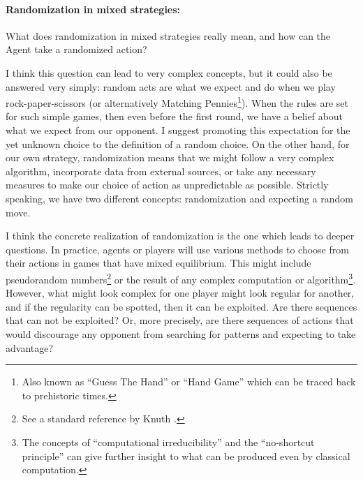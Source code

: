 \documentclass{article}
\begin{document}
\paragraph{Randomization in mixed strategies:}
What does randomization in mixed strategies really mean, and how can the Agent take a randomized action?

I think this question can lead to very complex concepts, but it could also be answered very simply: random acts are what we expect and do when we play rock-paper-scissors (or alternatively Matching Pennies\footnote{Also known as ``Guess The Hand'' or ``Hand Game'' \cite{book:CulinIndianGames,book:PrehistoricGames} which can be traced back to prehistoric times.}).
When the rules are set for such simple games, then even before the first round, we have a belief about what we expect from our opponent. I suggest promoting this expectation for the yet unknown choice to the definition of a random choice.
On the other hand, for our own strategy, randomization means that we might follow a very complex algorithm, incorporate data from external sources, or take any necessary measures to make our choice of action as unpredictable as possible.
Strictly speaking, we have two different concepts: randomization and expecting a random move.

I think the concrete realization of randomization is the one which leads to deeper questions.
In practice, agents or players will use various methods to choose from their actions in games that have mixed equilibrium. This might include pseudorandom numbers\footnote{See a standard reference by Knuth \cite{book:KnuthVol2}.} or the result of any complex computation or algorithm\footnote{The concepts of ``computational irreducibility'' \cite{paper:Wolfram1984,paper:Wolfram1985,book:NKS,book:IlachinskiCellularAutomata,book:SchiffCellularAutomata,paper:ComputationalIrreducibilityAndCorseGraining} and the ``no-shortcut principle'' \cite{paper:NoShortCut,paper:Lloyd2012FreeWill} can give further insight to what can be produced even by classical computation.}. However, what might look complex for one player might look regular for another, and if the regularity can be spotted, then it can be exploited.
Are there sequences that can not be exploited? Or, more precisely, are there sequences of actions that would discourage any opponent from searching for patterns and expecting to take advantage?
\end{document}
